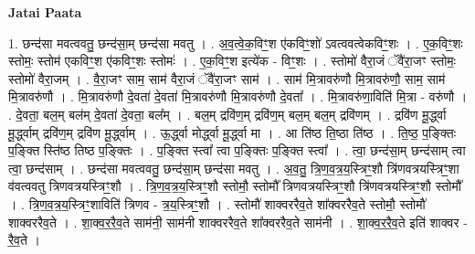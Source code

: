 \documentclass[17pt]{extarticle}
\begin{document}
\textbf{Jatai Paata} \newline

1. छन्द॑सा मवत्ववतु॒ छन्द॑सा॒म् छन्द॑सा मवतु । . अ॒व॒त्वे॒क॒विꣳ॒॒श ए॑कविꣳ॒॒शो॑ ऽवत्ववत्वेकविꣳ॒॒शः । . ए॒क॒विꣳ॒॒शः स्तोमः॒ स्तोम॑ एकविꣳ॒॒श ए॑कविꣳ॒॒शः स्तोमः॑ । . ए॒क॒विꣳ॒॒श इत्ये॑क - विꣳ॒॒शः । . स्तोमो॑ वैरा॒जं ॅवै॑रा॒जꣳ स्तोमः॒ स्तोमो॑ वैरा॒जम् । . वै॒रा॒जꣳ साम॒ साम॑ वैरा॒जं ॅवै॑रा॒जꣳ साम॑ । . साम॑ मि॒त्रावरु॑णौ मि॒त्रावरु॑णौ॒ साम॒ साम॑ मि॒त्रावरु॑णौ । . मि॒त्रावरु॑णौ दे॒वता॑ दे॒वता॑ मि॒त्रावरु॑णौ मि॒त्रावरु॑णौ दे॒वता᳚ । . मि॒त्रावरु॑णा॒विति॑ मि॒त्रा - वरु॑णौ । . दे॒वता॒ बल॒म् बल॑म् दे॒वता॑ दे॒वता॒ बल᳚म् । . बल॒म् द्रवि॑ण॒म् द्रवि॑ण॒म् बल॒म् बल॒म् द्रवि॑णम् । . द्रवि॑ण मू॒र्द्ध्वा मू॒र्द्ध्वाम् द्रवि॑ण॒म् द्रवि॑ण मू॒र्द्ध्वाम् । . ऊ॒र्द्ध्वा मोर्द्ध्वा मू॒र्द्ध्वा मा । . आ ति॑ष्ठ ति॒ष्ठा ति॑ष्ठ । . ति॒ष्ठ॒ प॒ङ्क्तिः प॒ङ्क्ति स्ति॑ष्ठ तिष्ठ प॒ङ्क्तिः । . प॒ङ्क्ति स्त्वा᳚ त्वा प॒ङ्क्तिः प॒ङ्क्ति स्त्वा᳚ । . त्वा॒ छन्द॑सा॒म् छन्द॑साम् त्वा त्वा॒ छन्द॑साम् । . छन्द॑सा मवत्ववतु॒ छन्द॑सा॒म् छन्द॑सा मवतु । . अ॒व॒तु॒ त्रि॒ण॒व॒त्र॒य॒स्त्रिꣳ॒॒शौ त्रि॑णवत्रयस्त्रिꣳ॒॒शा व॑वत्ववतु त्रिणवत्रयस्त्रिꣳ॒॒शौ । . त्रि॒ण॒व॒त्र॒य॒स्त्रिꣳ॒॒शौ स्तोमौ॒ स्तोमौ᳚ त्रिणवत्रयस्त्रिꣳ॒॒शौ त्रि॑णवत्रयस्त्रिꣳ॒॒शौ स्तोमौ᳚ । . त्रि॒ण॒व॒त्र॒य॒स्त्रिꣳ॒॒शाविति॑ त्रिणव - त्र॒य॒स्त्रिꣳ॒॒शौ । . स्तोमौ॑ शाक्वररैव॒ते शा᳚क्वररैव॒ते स्तोमौ॒ स्तोमौ॑ शाक्वररैव॒ते । . शा॒क्व॒र॒रै॒व॒ते साम॑नी॒ साम॑नी शाक्वररैव॒ते शा᳚क्वररैव॒ते साम॑नी । . शा॒क्व॒र॒रै॒व॒ते इति॑ शाक्वर - रै॒व॒ते । \newline
\end{document}
